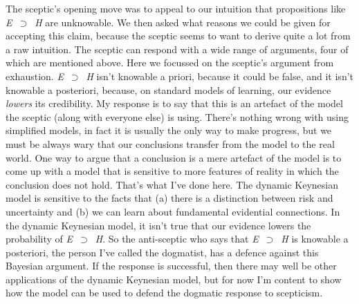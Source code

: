 The sceptic's opening move was to appeal to our intuition that propositions like \textit{E}~${\supset}$~\textit{H} are unknowable. We then asked what reasons we could be given for accepting this claim, because the sceptic seems to want to derive quite a lot from a raw intuition. The sceptic can respond with a wide range of arguments, four of which are mentioned above. Here we focussed on the sceptic's argument from exhaustion. \textit{E}~${\supset}$~\textit{H} isn't knowable a priori, because it could be false, and it isn't knowable a posteriori, because, on standard models of learning, our evidence \textit{lowers} its credibility. My response is to say that this is an artefact of the model the sceptic (along with everyone else) is using. There's nothing wrong with using simplified models, in fact it is usually the only way to make progress, but we must be always wary that our conclusions transfer from the model to the real world. One way to argue that a conclusion is a mere artefact of the model is to come up with a model that is sensitive to more features of reality in which the conclusion does not hold. That's what I've done here. The dynamic Keynesian model is sensitive to the facts that (a) there is a distinction between risk and uncertainty and (b) we can learn about fundamental evidential connections. In the dynamic Keynesian model, it isn't true that our evidence lowers the probability of \textit{E}~${\supset}$~\textit{H}. So the anti-sceptic who says that \textit{E}~${\supset}$~\textit{H} is knowable a posteriori, the person I've called the dogmatist, has a defence against this Bayesian argument. If the response is successful, then there may well be other applications of the dynamic Keynesian model, but for now I'm content to show how the model can be used to defend the dogmatic response to scepticism. 